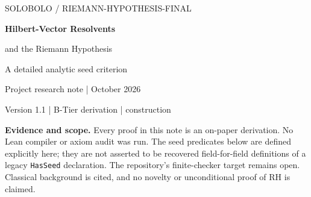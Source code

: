 \documentclass[11pt,a4paper]{article}
\numberwithin{equation}{section}
\theoremstyle{definition}
\theoremstyle{remark}
\newcommand{\norm}[1]{\lVert #1\rVert}
\begin{document}
\begin{center}
{\small\sffamily\color{linkblue} SOLOBOLO \enspace / \enspace RIEMANN-HYPOTHESIS-FINAL}\par
\vspace{9pt}
{\LARGE\bfseries\color{ink} Hilbert-Vector Resolvents\par
and the Riemann Hypothesis}\par
\vspace{7pt}
{\large A detailed analytic seed criterion}\par
\vspace{9pt}
{\small Project research note \enspace |  October 2026}\par
{\small Version 1.1 \enspace | \enspace B-Tier derivation \enspace | \enspace construction}
\end{center}
\vspace{5pt}
\begin{abstract}
We give a precise, self-contained analytic formulation of a Hilbert-vector
anchor for the Riemann hypothesis. Let $\Theta$ be the entire function
determined by $\Theta(w^2)=\xi(\tfrac12+w)$, and put
$L(a)=\Theta'(a)/\Theta(a)$ for $a\geq0$. We prove that RH is equivalent
to the existence of one Hilbert space, one bounded nonnegative self-adjoint
operator $K$, and one fixed vector $v$ such that
$\frac{\mathrm d}{\mathrm da}(aL(a))=\norm{(I+aK)^{-1}v}^2$
on a nonempty positive interval. The derivation includes the resolvent
calculus, its divided-difference Gram kernel, and the analytic continuation
that excludes zeros off the negative real axis. A possible $C/a$ ambiguity
is removed using $\Theta(0)\ne0$, rather than suppressed by an unstated
normalization. The reverse implication constructs a positive diagonal
operator from the zero product under RH, with multiplicities counted
correctly. We also develop the spectral-measure and all-order moment
formulations, explain basepoint shifts, and prove that no exactly calibrated
finite-dimensional model can suffice. The result is an analytic equivalence;
it does not construct the required seed unconditionally or produce an
accepted finite witness. Hyperbolic zeta identities additionally give
explicit comparison models and a conditional determinant-limit route
to the actual seed.
\end{abstract}
\begin{scopebox}
\small\textbf{Evidence and scope.} Every proof in this note is an on-paper
derivation. No Lean compiler or axiom audit was run. The seed predicates
below are defined explicitly here; they are not asserted to be recovered
field-for-field definitions of a legacy \texttt{HasSeed} declaration.
The repository's finite-checker target remains open. Classical background
is cited, and no novelty or unconditional proof of RH is claimed.
\end{scopebox}
\vspace{5pt}
\end{document}

